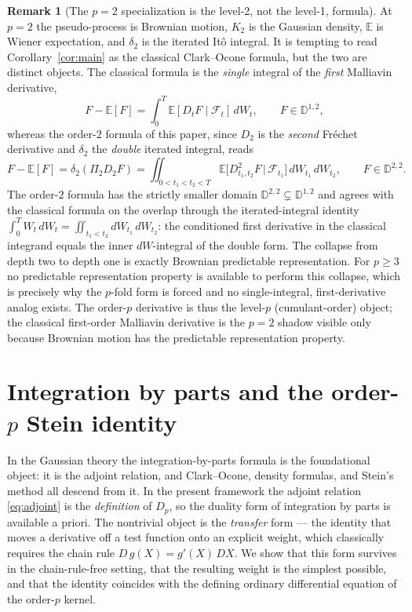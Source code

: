 \documentclass[11pt,reqno]{amsart}
\theoremstyle{plain}
\theoremstyle{definition}
\newtheorem{remark}[theorem]{Remark}
\newcommand{\E}{\mathbb{E}}
\begin{document}
\begin{remark}[The $p=2$ specialization is the level-2, not the level-1, formula]
\label{rem:p2}
At $p=2$ the pseudo-process is Brownian motion, $K_2$ is the Gaussian density, $\E$ is Wiener expectation, and $\delta_2$ is the iterated It\^o integral. It is tempting to read Corollary~\ref{cor:main} as the classical Clark--Ocone formula, but the two are distinct objects. The classical formula is the \emph{single} integral of the \emph{first} Malliavin derivative,
\[
F - \E[F] = \int_0^T \E[D_t F \mid \mathcal F_t]\, dW_t, \qquad F \in \mathbb{D}^{1,2},
\]
whereas the order-$2$ formula of this paper, since $D_2$ is the \emph{second} Fréchet derivative and $\delta_2$ the \emph{double} iterated integral, reads
\[
F - \E[F] = \delta_2(\Pi_2 D_2 F) = \iint_{0 < t_1 < t_2 < T} \E\bigl[D^2_{t_1,t_2}F \,\big|\, \mathcal F_{t_1}\bigr]\, dW_{t_1}\, dW_{t_2}, \qquad F \in \mathbb{D}^{2,2}.
\]
The order-$2$ formula has the strictly smaller domain $\mathbb{D}^{2,2} \subsetneq \mathbb{D}^{1,2}$ and agrees with the classical formula on the overlap through the iterated-integral identity $\int_0^T W_t\, dW_t = \iint_{t_1<t_2} dW_{t_1}\,dW_{t_2}$: the conditioned first derivative in the classical integrand equals the inner $dW$-integral of the double form. The collapse from depth two to depth one is exactly Brownian predictable representation. For $p \geq 3$ no predictable representation property is available to perform this collapse, which is precisely why the $p$-fold form is forced and no single-integral, first-derivative analog exists. The order-$p$ derivative is thus the level-$p$ (cumulant-order) object; the classical first-order Malliavin derivative is the $p=2$ shadow visible only because Brownian motion has the predictable representation property.
\end{remark}

\section{Integration by parts and the order-\texorpdfstring{$p$}{p} Stein identity}
\label{sec:ibp}

In the Gaussian theory the integration-by-parts formula is the foundational object: it is the adjoint relation, and Clark--Ocone, density formulas, and Stein's method all descend from it. In the present framework the adjoint relation \eqref{eq:adjoint} is the \emph{definition} of $D_p$, so the duality form of integration by parts is available a priori. The nontrivial object is the \emph{transfer} form --- the identity that moves a derivative off a test function onto an explicit weight, which classically requires the chain rule $D\,g(X) = g'(X)\,DX$. We show that this form survives in the chain-rule-free setting, that the resulting weight is the simplest possible, and that the identity coincides with the defining ordinary differential equation of the order-$p$ kernel.
\end{document}

